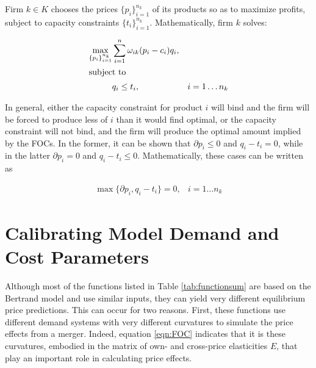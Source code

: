 \documentclass[11pt,numbers=noenddot,pointlessnumbers]{scrreprt}
\newcommand{\atr}{{\tt antitrust}}
\numberwithin{equation}{section}
\begin{document}
Firm $k \in K$ chooses the prices $\{p_i\}_{i=1}^{n_k}$ of its
products so as to maximize profits, subject to capacity constraints $\{t_i\}_{i=1}^{n_k}$.
Mathematically, firm $k$ solves:

\begin{align*}
  \max_{\{p_i\}_{i=1}^{n_k}} &\sum_{i=1}^{n}\omega_{ik}(p_i - c_i)q_i,\\
  \intertext{subject to}
  & q_i \le t_i,&i=1\ldots n_k
\end{align*}

In general, either the capacity constraint for product $i$ will bind
and the firm will
be forced to produce less of $i$ than it would find optimal, or the capacity
constraint will not bind, and the firm will produce the optimal
amount implied by the FOCs. In the former, it can be shown that
$\partial p_i\le 0$ and $q_i - t_i=0$,
while in the latter
$\partial p_i=0$ and $q_i - t_i \le 0$. Mathematically, these cases can be
written as

\begin{align}
  \max\{\partial p_i, q_i - t_i\}=0,&i=1\ldots n_k
\label{eqn:FOCC}
\end{align}


\section{Calibrating Model Demand and Cost Parameters \label{sec:bertcal}}

Although most of the functions listed in Table \ref{tab:functionsum} are
based on the Bertrand model and use similar inputs, they can yield
very different equilibrium price predictions. This can occur for two
reasons. First, these functions
use different demand systems with very different
curvatures to simulate the price effects from a
merger. Indeed, equation \ref{eqn:FOC} indicates that it is these
curvatures, embodied in the matrix of own- and cross-price
elasticities $E$, that play an important role in calculating price
effects.
\end{document}
